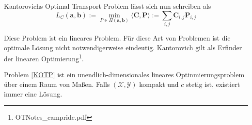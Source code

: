 \documentclass[11pt,a4paper]{article}
\newtheorem{definition}[theorem]{Definition}
\numberwithin{equation}{section}
\begin{document}
	Kantorovichs Optimal Transport Problem lässt sich nun schreiben als 
	\begin{equation}
	L_C(\boldsymbol{a}, \boldsymbol{b}) := \min_{P \in \Pi(\boldsymbol{a}, \boldsymbol{b})} \langle \boldsymbol{C}, \boldsymbol{P} \rangle := \sum_{i,j}{\boldsymbol{C}_{i,j}\boldsymbol{P}_{i,j}} \label{KOTP}
	\end{equation}
	
	Diese Problem ist ein lineares Problem. Für diese Art von Problemen ist die optimale Lösung nicht notwendigerweise eindeutig. Kantorovich gilt als Erfinder der linearen Optimierung\footnote{OTNotes\_campride.pdf}.

	Problem \autoref{KOTP} ist ein unendlich-dimensionales lineares Optinmierungsproblem über einem Raum von Maßen. Falls $(\mathcal{X}, \mathcal{Y})$ kompakt und $c$ stetig ist, existiert immer eine Lösung.
	
\end{document}
